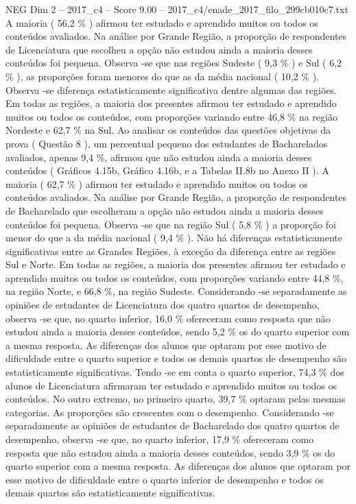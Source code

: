 \begin{textsample}{NEG Dim 2 – 2017\_c4 – Score 9.00 – 2017\_c4/enade\_2017\_filo\_299cb010c7.txt}
A maioria ( 56,2 \% ) afirmou ter estudado e aprendido muitos ou todos os conteúdos avaliados.
Na análise por Grande Região, a proporção de respondentes de Licenciatura que escolheu a opção não estudou ainda a maioria desses conteúdos foi pequena.
Observa -se que nas regiões Sudeste ( 9,3 \% ) e Sul ( 6,2 \% ), as proporções foram menores do que as da média nacional ( 10,2 \% ).
Observa -se diferença estatisticamente significativa dentre algumas das regiões.
Em todas as regiões, a maioria dos presentes afirmou ter estudado e aprendido muitos ou todos os conteúdos, com proporções variando entre 46,8 \% na região Nordeste e 62,7 \% na Sul.
Ao analisar os conteúdos das questões objetivas da prova ( Questão 8 ), um percentual pequeno dos estudantes de Bacharelados avaliados, apenas 9,4 \%, afirmou que não estudou ainda a maioria desses conteúdos ( Gráficos 4.15b, Gráfico 4.16b, e a Tabelas II.8b no Anexo II ).
A maioria ( 62,7 \% ) afirmou ter estudado e aprendido muitos ou todos os conteúdos avaliados.
Na análise por Grande Região, a proporção de respondentes de Bacharelado que escolheram a opção não estudou ainda a maioria desses conteúdos foi pequena.
Observa -se que na região Sul ( 5,8 \% ) a proporção foi menor do que a da média nacional ( 9,4 \% ).
Não há diferenças estatisticamente significativas entre as Grandes Regiões, à exceção da diferença entre as regiões Sul e Norte.
Em todas as regiões, a maioria dos presentes afirmou ter estudado e aprendido muitos ou todos os conteúdos, com proporções variando entre 44,8 \%, na região Norte, e 66,8 \%, na região Sudeste.
Considerando -se separadamente as opiniões de estudantes de Licenciatura dos quatro quartos de desempenho, observa -se que, no quarto inferior, 16,0 \% ofereceram como resposta que não estudou ainda a maioria desses conteúdos, sendo 5,2 \% os do quarto superior com a mesma resposta.
As diferenças dos alunos que optaram por esse motivo de dificuldade entre o quarto superior e todos os demais quartos de desempenho são estatisticamente significativas.
Tendo -se em conta o quarto superior, 74,3 \% dos alunos de Licenciatura afirmaram ter estudado e aprendido muitos ou todos os conteúdos.
No outro extremo, no primeiro quarto, 39,7 \% optaram pelas mesmas categorias.
As proporções são crescentes com o desempenho.
Considerando -se separadamente as opiniões de estudantes de Bacharelado dos quatro quartos de desempenho, observa -se que, no quarto inferior, 17,9 \% ofereceram como resposta que não estudou ainda a maioria desses conteúdos, sendo 3,9 \% os do quarto superior com a mesma resposta.
As diferenças dos alunos que optaram por esse motivo de dificuldade entre o quarto inferior de desempenho e todos os demais quartos são estatisticamente significativas.

\end{textsample}
